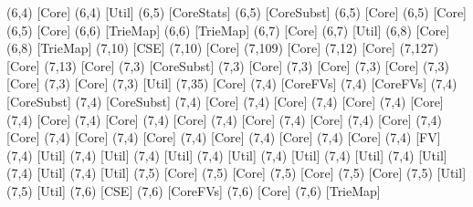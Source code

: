 {(6,4) [Core] %
(6,4) [Util] %
(6,5) [CoreStats] %
(6,5) [CoreSubst] %
(6,5) [Core] %
(6,5) [Core] %
(6,5) [Core] %
(6,6) [TrieMap] %
(6,6) [TrieMap] %
(6,7) [Core] %
(6,7) [Util] %
(6,8) [Core] %
(6,8) [TrieMap] %
(7,10) [CSE] %
(7,10) [Core] %
(7,109) [Core] %
(7,12) [Core] %
(7,127) [Core] %
(7,13) [Core] %
(7,3) [CoreSubst] %
(7,3) [Core] %
(7,3) [Core] %
(7,3) [Core] %
(7,3) [Core] %
(7,3) [Core] %
(7,3) [Util] %
(7,35) [Core] %
(7,4) [CoreFVs] %
(7,4) [CoreFVs] %
(7,4) [CoreSubst] %
(7,4) [CoreSubst] %
(7,4) [Core] %
(7,4) [Core] %
(7,4) [Core] %
(7,4) [Core] %
(7,4) [Core] %
(7,4) [Core] %
(7,4) [Core] %
(7,4) [Core] %
(7,4) [Core] %
(7,4) [Core] %
(7,4) [Core] %
(7,4) [Core] %
(7,4) [Core] %
(7,4) [Core] %
(7,4) [Core] %
(7,4) [Core] %
(7,4) [FV] %
(7,4) [Util] %
(7,4) [Util] %
(7,4) [Util] %
(7,4) [Util] %
(7,4) [Util] %
(7,4) [Util] %
(7,4) [Util] %
(7,4) [Util] %
(7,4) [Util] %
(7,5) [Core] %
(7,5) [Core] %
(7,5) [Core] %
(7,5) [Core] %
(7,5) [Util] %
(7,5) [Util] %
(7,6) [CSE] %
(7,6) [CoreFVs] %
(7,6) [Core] %
(7,6) [TrieMap] %
}
